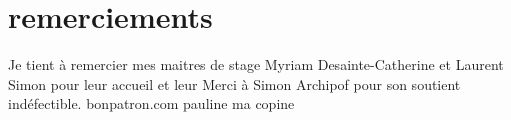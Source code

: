 \chapter*{remerciements}

Je tient à remercier mes maitres de stage Myriam Desainte-Catherine et Laurent Simon pour leur accueil et leur  
Merci à Simon Archipof pour son soutient indéfectible.
bonpatron.com
pauline ma copine